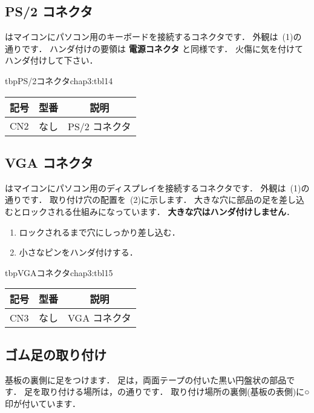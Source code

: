 \subsection{PS/2 コネクタ}
はマイコンにパソコン用のキーボードを接続するコネクタです．
外観は~(1)の通りです．
ハンダ付けの要領は {\bf 電源コネクタ} と同様です．
火傷に気を付けてハンダ付けして下さい．

\begin{mytable}{tbp}{PS/2コネクタ}{chap3:tbl14}
{\small\begin{tabular}{l|l|l}
\hline
\hline
\multicolumn{1}{c|}{記号} &
\multicolumn{1}{c|}{型番} &
\multicolumn{1}{c}{説明} \\
\hline
CN2 & なし & PS/2 コネクタ \\
\end{tabular}}
\end{mytable}


\subsection{VGA コネクタ}
はマイコンにパソコン用のディスプレイを接続するコネクタです．
外観は~(1)の通りです．
取り付け穴の配置を~(2)に示します．
大きな穴に部品の足を差し込むとロックされる仕組みになっています．
{\bf 大きな穴はハンダ付けしません}．

\begin{enumerate}
\item ロックされるまで穴にしっかり差し込む．
\item 小さなピンをハンダ付けする．
\end{enumerate}

\begin{mytable}{tbp}{VGAコネクタ}{chap3:tbl15}
{\small\begin{tabular}{l|l|l}
\hline
\hline
\multicolumn{1}{c|}{記号} &
\multicolumn{1}{c|}{型番} &
\multicolumn{1}{c}{説明} \\
\hline
CN3 & なし & VGA コネクタ \\
\end{tabular}}
\end{mytable}


\subsection{ゴム足の取り付け}
基板の裏側に足をつけます．
足は，両面テープの付いた黒い円盤状の部品です．
足を取り付ける場所は，の通りです．
取り付け場所の裏側(基板の表側)に○印が付いています．

